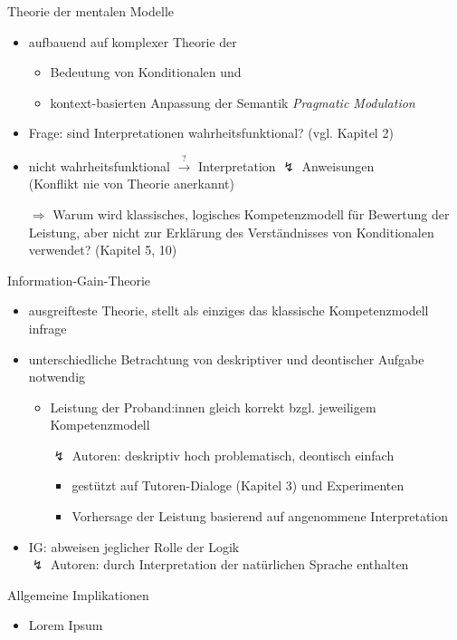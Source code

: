 \begin{frame}{Theorie der mentalen Modelle {\scriptsize \cite[S.~113-114]{stenningHumanReasoningCognitive2008}}}
    \begin{itemize}
        \item aufbauend auf komplexer Theorie der
        \begin{itemize}
            \item Bedeutung von Konditionalen und
            \item kontext-basierten Anpassung der Semantik {\footnotesize \emph{Pragmatic Modulation}}
        \end{itemize}
        
        \item Frage: sind Interpretationen wahrheitsfunktional? {\scriptsize (vgl. Kapitel 2)}
        
        \item nicht wahrheitsfunktional $\overset?\to$ Interpretation $\lightning$ Anweisungen \\
            {\footnotesize (Konflikt nie von Theorie anerkannt)}
        \pause

        \item[$\Rightarrow$] Warum wird klassisches, logisches Kompetenzmodell für \alert{Bewertung der Leistung}, 
            aber nicht zur Erklärung des \alert{Verständnisses von Konditionalen} verwendet? {\footnotesize (Kapitel 5, 10)}
    \end{itemize}
\end{frame}


\begin{frame}{Information-Gain-Theorie {\scriptsize \cite[S.~114-115]{stenningHumanReasoningCognitive2008}}}
    \begin{itemize}
        \item ausgreifteste Theorie, stellt als einziges das klassische Kompetenzmodell infrage
        \item unterschiedliche Betrachtung von deskriptiver und deontischer Aufgabe notwendig
        \begin{itemize}
            \item Leistung der Proband:innen gleich korrekt bzgl. jeweiligem Kompetenzmodell
            \item[$\lightning$] Autoren: deskriptiv hoch problematisch, deontisch einfach
            \begin{itemize}
                \item gestützt auf Tutoren-Dialoge (Kapitel 3) und Experimenten
                \item Vorhersage der Leistung basierend auf angenommene Interpretation
            \end{itemize}
        \end{itemize}
        \item IG: abweisen jeglicher Rolle der Logik \\
            $\lightning$ Autoren: durch Interpretation der natürlichen Sprache enthalten
    \end{itemize}
\end{frame}


\begin{frame}{Allgemeine Implikationen {\scriptsize \cite[S.~115]{stenningHumanReasoningCognitive2008}}}
    \begin{itemize}
        \item Lorem Ipsum
    \end{itemize}
\end{frame}
